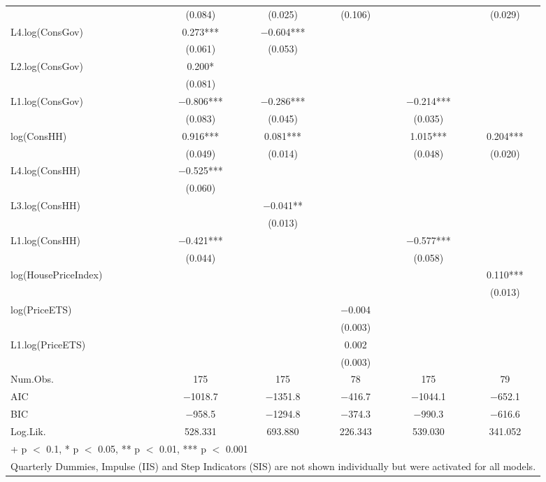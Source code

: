 \begin{table}
{\begin{tabular}[t]{lccccc}
 & (\num{0.084}) & (\num{0.025}) & (\num{0.106}) &  & (\num{0.029})\\
L4.log(ConsGov) & \num{0.273}*** & \num{-0.604}*** &  &  & \\
 & (\num{0.061}) & (\num{0.053}) &  &  & \\
L2.log(ConsGov) & \num{0.200}* &  &  &  & \\
 & (\num{0.081}) &  &  &  & \\
L1.log(ConsGov) & \num{-0.806}*** & \num{-0.286}*** &  & \num{-0.214}*** & \\
 & (\num{0.083}) & (\num{0.045}) &  & (\num{0.035}) & \\
log(ConsHH) & \num{0.916}*** & \num{0.081}*** &  & \num{1.015}*** & \num{0.204}***\\
 & (\num{0.049}) & (\num{0.014}) &  & (\num{0.048}) & (\num{0.020})\\
L4.log(ConsHH) & \num{-0.525}*** &  &  &  & \\
 & (\num{0.060}) &  &  &  & \\
L3.log(ConsHH) &  & \num{-0.041}** &  &  & \\
 &  & (\num{0.013}) &  &  & \\
L1.log(ConsHH) & \num{-0.421}*** &  &  & \num{-0.577}*** & \\
 & (\num{0.044}) &  &  & (\num{0.058}) & \\
log(HousePriceIndex) &  &  &  &  & \num{0.110}***\\
 &  &  &  &  & (\num{0.013})\\
log(PriceETS) &  &  & \num{-0.004} &  & \\
 &  &  & (\num{0.003}) &  \vphantom{1} & \\
L1.log(PriceETS) &  &  & \num{0.002} &  & \\
 &  &  & (\num{0.003}) &  & \\
\midrule
Num.Obs. & \num{175} & \num{175} & \num{78} & \num{175} & \num{79}\\
AIC & \num{-1018.7} & \num{-1351.8} & \num{-416.7} & \num{-1044.1} & \num{-652.1}\\
BIC & \num{-958.5} & \num{-1294.8} & \num{-374.3} & \num{-990.3} & \num{-616.6}\\
Log.Lik. & \num{528.331} & \num{693.880} & \num{226.343} & \num{539.030} & \num{341.052}\\
\bottomrule
\multicolumn{6}{l}{\rule{0pt}{1em}+ p $<$ 0.1, * p $<$ 0.05, ** p $<$ 0.01, *** p $<$ 0.001}\\
\multicolumn{6}{l}{\rule{0pt}{1em}Quarterly Dummies, Impulse (IIS) and Step Indicators (SIS) are not shown individually but were activated for all models.}\\
\end{tabular}}
\end{table}

